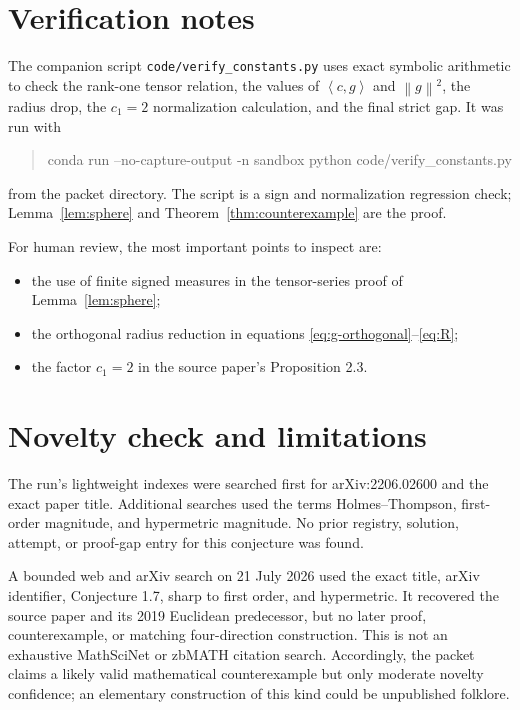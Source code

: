 \documentclass[11pt]{article}
\newcommand{\ip}[2]{\left\langle #1,#2\right\rangle}
\newcommand{\norm}[1]{\left\lVert #1\right\rVert}
\begin{document}
\section{Verification notes}

The companion script \texttt{code/verify\_constants.py} uses exact symbolic
arithmetic to check the rank-one tensor relation, the values of
\(\ip{c}{g}\) and \(\norm{g}^2\), the radius drop, the \(c_1=2\)
normalization calculation, and the final strict gap. It was run with
\begin{quote}\ttfamily
conda run --no-capture-output -n sandbox python
code/verify\_constants.py
\end{quote}
from the packet directory. The script is a sign and normalization regression
check; Lemma~\ref{lem:sphere} and Theorem~\ref{thm:counterexample} are the
proof.

For human review, the most important points to inspect are:
\begin{itemize}
\item the use of finite signed measures in the tensor-series proof of
      Lemma~\ref{lem:sphere};
\item the orthogonal radius reduction in equations
      \eqref{eq:g-orthogonal}--\eqref{eq:R};
\item the factor \(c_1=2\) in the source paper's Proposition 2.3.
\end{itemize}

\section{Novelty check and limitations}

The run's lightweight indexes were searched first for arXiv:2206.02600 and
the exact paper title. Additional searches used the terms
Holmes--Thompson, first-order magnitude, and hypermetric magnitude. No prior
registry, solution, attempt, or proof-gap entry for this conjecture was found.

A bounded web and arXiv search on 21 July 2026 used the exact title, arXiv
identifier, Conjecture 1.7, sharp to first order, and hypermetric. It
recovered the source paper and its 2019 Euclidean predecessor, but no later
proof, counterexample, or matching four-direction construction. This is not
an exhaustive MathSciNet or zbMATH citation search. Accordingly, the packet
claims a likely valid mathematical counterexample but only moderate novelty
confidence; an elementary construction of this kind could be unpublished
folklore.
\end{document}
